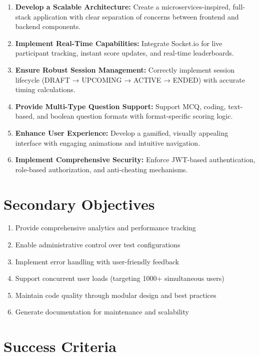 \documentclass[12pt,a4paper]{report}
\begin{document}
\begin{enumerate}[left=0pt]
  \item \textbf{Develop a Scalable Architecture:} Create a microservices-inspired, full-stack application with clear separation of concerns between frontend and backend components.
  
  \item \textbf{Implement Real-Time Capabilities:} Integrate Socket.io for live participant tracking, instant score updates, and real-time leaderboards.
  
  \item \textbf{Ensure Robust Session Management:} Correctly implement session lifecycle (DRAFT → UPCOMING → ACTIVE → ENDED) with accurate timing calculations.
  
  \item \textbf{Provide Multi-Type Question Support:} Support MCQ, coding, text-based, and boolean question formats with format-specific scoring logic.
  
  \item \textbf{Enhance User Experience:} Develop a gamified, visually appealing interface with engaging animations and intuitive navigation.
  
  \item \textbf{Implement Comprehensive Security:} Enforce JWT-based authentication, role-based authorization, and anti-cheating mechanisms.
\end{enumerate}

\section{Secondary Objectives}

\begin{enumerate}[left=0pt,start=7]
  \item Provide comprehensive analytics and performance tracking
  \item Enable administrative control over test configurations
  \item Implement error handling with user-friendly feedback
  \item Support concurrent user loads (targeting 1000+ simultaneous users)
  \item Maintain code quality through modular design and best practices
  \item Generate documentation for maintenance and scalability
\end{enumerate}

\section{Success Criteria}
\end{document}
